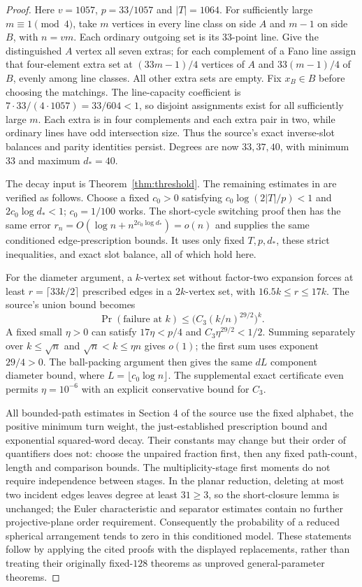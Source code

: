 \documentclass[11pt]{article}
\begin{document}
\begin{proof}
Here $v=1057$, $p=33/1057$ and $|T|=1064$. For sufficiently large
$m\equiv1\pmod4$, take $m$ vertices in every line class on side $A$
and $m-1$ on side $B$, with $n=vm$. Each ordinary outgoing set is its
33-point line. Give the distinguished $A$ vertex all seven extras;
for each complement of a Fano line assign that four-element extra set
at $(33m-1)/4$ vertices of $A$ and $33(m-1)/4$ of $B$, evenly among
line classes. All other extra sets are empty.
Fix $x_B\in B$ before choosing the matchings.
The line-capacity coefficient is $7\cdot33/(4\cdot1057)=33/604<1$,
so disjoint assignments exist for all sufficiently large $m$.
Each extra is in four complements and each extra pair in two, while
ordinary lines have odd intersection size. Thus the source's exact
inverse-slot balances and parity identities persist. Degrees are now
$33,37,40$, with minimum $33$ and maximum $d_*=40$.

The decay input is Theorem~\ref{thm:threshold}. The remaining estimates
in \cite[Sections 3--5]{OpenAI} are verified as follows.
Choose a fixed $c_0>0$ satisfying
$c_0\log(2|T|/p)<1$ and $2c_0\log d_*<1$; $c_0=1/100$ works.
The short-cycle switching proof then has the same error
$r_n=O(\log n+n^{2c_0\log d_*})=o(n)$ and supplies the same conditioned
edge-prescription bounds. It uses only fixed $T,p,d_*$, these strict
inequalities, and exact slot balance, all of which hold here.

For the diameter argument, a $k$-vertex set without factor-two expansion
forces at least $r=\lceil33k/2\rceil$ prescribed edges in a $2k$-vertex
set, with $16.5k\le r\le17k$. The source's union bound becomes
\[
\Pr(\text{failure at }k)
 \le\bigl(C_3(k/n)^{29/2}\bigr)^k.
\]
A fixed small $\eta>0$ can satisfy $17\eta<p/4$ and
$C_3\eta^{29/2}<1/2$. Summing separately over $k\le\sqrt n$ and
$\sqrt n<k\le\eta n$ gives $o(1)$; the first sum uses exponent
$29/4>0$. The ball-packing argument then gives the same $dL$ component
diameter bound, where $L=\lfloor c_0\log n\rfloor$.
The supplemental exact certificate even permits $\eta=10^{-6}$ with
an explicit conservative bound for $C_3$.

All bounded-path estimates in Section 4 of the source use the fixed
alphabet, the positive minimum turn weight, the just-established
prescription bound and exponential squared-word decay. Their constants
may change but their order of quantifiers does not: choose the unpaired
fraction first, then any fixed path-count, length and comparison bounds.
The multiplicity-stage first moments do not require independence between
stages. In the planar reduction, deleting at most two incident edges
leaves degree at least $31\ge3$, so the short-closure lemma is unchanged;
the Euler characteristic and separator estimates contain no further
projective-plane order requirement. Consequently the probability of a
reduced spherical arrangement tends to zero in this conditioned model.
These statements follow by applying the cited proofs with the displayed
replacements, rather than treating their originally fixed-$128$
theorems as unproved general-parameter theorems.


\end{proof}
\end{document}
